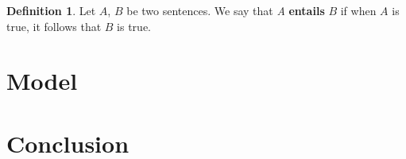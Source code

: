 \documentclass[a4paper, 12pt]{article}
\theoremstyle{definition}
\newtheorem{definition}{Definition}[section]
\begin{document}
\begin{definition}
Let $A$, $B$ be two sentences. We say that \textit{A} \textbf{entails} $B$ if when $A$ is true, it follows that $B$ is true. \end{definition}




\section{Model}

\section{Conclusion}
\end{document}
